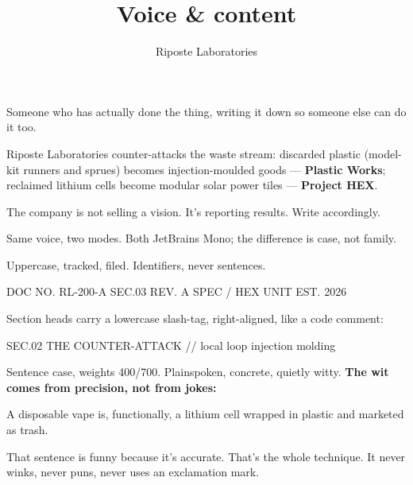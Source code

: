 \documentclass[fontpath=fonts/,logopath=logo/]{riposte-doc}
\title{Voice \& content}
\author{Riposte Laboratories}
\date{}
\begin{document}
\ripmakehead

\riptoc



Someone who has actually done the thing, writing it down so someone else can do it too.

Riposte Laboratories counter-attacks the waste stream: discarded plastic (model-kit runners and sprues) becomes injection-moulded goods — \textbf{Plastic Works}; reclaimed lithium cells become modular solar power tiles — \textbf{Project HEX}.

The company is not selling a vision. It's reporting results. Write accordingly.



Same voice, two modes. Both JetBrains Mono; the difference is case, not family.



Uppercase, tracked, filed. Identifiers, never sentences.

\ripcodeopen
{}
\begin{ripcodeblock}
DOC NO. RL-200-A     SEC.03     REV. A     SPEC / HEX UNIT     EST. 2026
\end{ripcodeblock}
\ripcodesizereset\ripcodeclose

Section heads carry a lowercase slash-tag, right-aligned, like a code comment:

\ripcodeopen
{}
\begin{ripcodeblock}
SEC.02   THE COUNTER-ATTACK                    // local loop injection molding
\end{ripcodeblock}
\ripcodesizereset\ripcodeclose



Sentence case, weights 400/700. Plainspoken, concrete, quietly witty. \textbf{The wit comes from precision, not from jokes:}

\begin{ripnote}
A disposable vape is, functionally, a lithium cell wrapped in plastic and marketed as trash.
\end{ripnote}

That sentence is funny because it's accurate. That's the whole technique. It never winks, never puns, never uses an exclamation mark.


\end{document}
